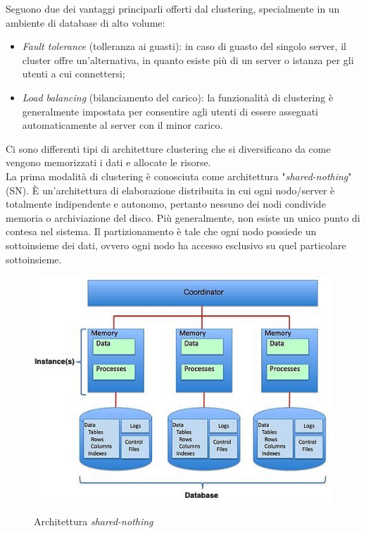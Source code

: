 Seguono due dei vantaggi principarli offerti dal clustering, specialmente in un ambiente di database di alto volume:
\begin{itemize}
\item 
\textit{Fault tolerance} (tolleranza ai guasti): in caso di guasto del singolo server, il cluster offre un'alternativa, in quanto esiste pi\`{u} di un server o istanza per gli utenti a cui connettersi;
\item
\textit{Load balancing} (bilanciamento del carico): la funzionalit\`{a} di clustering \`{e} generalmente impostata per consentire agli utenti di essere assegnati automaticamente al server con il minor carico.\cite{etichetta1} 
\end{itemize}
Ci sono differenti tipi di architetture clustering che si diversificano da come vengono memorizzati i dati e allocate le risorse.\\
La prima modalit\`{a} di clustering \`{e} conosciuta come architettura "\textit{shared-nothing}" (SN). \`{E} un'architettura di elaborazione distribuita in cui ogni nodo/server \`{e} totalmente indipendente e autonomo, pertanto nessuno dei nodi condivide memoria o archiviazione del disco. Pi\`{u} generalmente, non esiste un unico punto di contesa nel sistema.\cite{etichetta5} Il partizionamento \`{e} tale che ogni nodo possiede un sottoinsieme dei dati, ovvero ogni nodo ha accesso esclusivo su quel particolare sottoinsieme. 
\cite{etichetta2}\\

\begin{figure}[htbp]
\centering
\includegraphics[scale=0.70]{img/Shared_Nothing_Architecture.jpg}\\
\caption{Architettura \textit{shared-nothing}\label{figura1.1} \cite{etichetta7}}
\end{figure}

